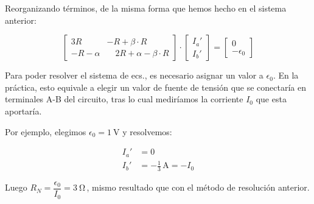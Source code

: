 \vspace{2mm}
Reorganizando términos, de la misma forma que hemos hecho en el sistema anterior:

\begin{equation*}
  \begin{bmatrix}
    3R & -R + \beta \cdot R\\[4pt]
    -R - \alpha & \quad 2R + \alpha - \beta \cdot R
  \end{bmatrix} \cdot %
  \begin{bmatrix}
    I_a'\\[4pt]
    I_b'
  \end{bmatrix} = %
  \begin{bmatrix}
    0\\[4pt]
    -\epsilon_0
  \end{bmatrix}
\end{equation*}

\vspace{2mm}
Para poder resolver el sistema de ecs., es necesario asignar un valor a $\epsilon_0$. En la práctica, esto equivale a elegir un valor de fuente de tensión que se conectaría en terminales A-B del circuito, tras lo cual mediríamos la corriente $I_0$ que esta aportaría. 

\vspace{2mm}
Por ejemplo, elegimos $\epsilon_0=\qty{1}{\volt}$ y resolvemos:

\vspace{-3mm}
\begin{align*}
    I_a' &= 0\\[5pt]
    I_b' &= -\frac{1}{3}\,\si{\ampere} = -I_0
\end{align*}

Luego $R_N = \dfrac{\epsilon_0}{I_0} = \boxed{\qty{3}{\ohm}} \,$, mismo resultado que con el método de resolución anterior.




